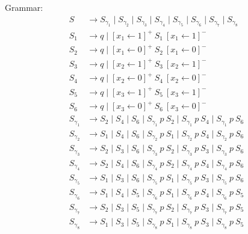 Grammar:
\begin{align*}
S & \to S_{\gamma_1} \mid S_{\gamma_2} \mid S_{\gamma_3} \mid S_{\gamma_4} \mid S_{\gamma_5} \mid S_{\gamma_6} \mid S_{\gamma_7} \mid S_{\gamma_8}\\
S_1 & \to q  
      \mid [x_1 \leftarrow 1]^+ \ S_1 \ [x_1 \leftarrow 1]^- \\ 
S_2 & \to q  
      \mid [x_1 \leftarrow 0]^+ \ S_2 \ [x_1 \leftarrow 0]^- \\ 
S_3 & \to q  
      \mid [x_2 \leftarrow 1]^+ \ S_3 \ [x_2 \leftarrow 1]^- \\ 
S_4 & \to q 
      \mid [x_2 \leftarrow 0]^+ \ S_4 \ [x_2 \leftarrow 0]^- \\ 
S_5 & \to q
      \mid [x_3 \leftarrow 1]^+ \ S_5 \ [x_3 \leftarrow 1]^- \\ 
S_6 & \to q
      \mid [x_3 \leftarrow 0]^+ \ S_6 \ [x_3 \leftarrow 0]^- \\ 
S_{\gamma_1} & \to S_2 \mid S_4 \mid S_6 \mid S_{\gamma_1} \ p \ S_2 \mid S_{\gamma_1} \ p \ S_4 \mid S_{\gamma_1} \ p \ S_6\\
S_{\gamma_2} & \to S_1 \mid S_4 \mid S_6 \mid S_{\gamma_2} \ p \ S_1 \mid S_{\gamma_2} \ p \ S_4 \mid S_{\gamma_2} \ p \ S_6\\
S_{\gamma_3} & \to S_2 \mid S_3 \mid S_6 \mid S_{\gamma_3} \ p \ S_2 \mid S_{\gamma_3} \ p \ S_3 \mid S_{\gamma_3} \ p \ S_6\\
S_{\gamma_4} & \to S_2 \mid S_4 \mid S_6 \mid S_{\gamma_4} \ p \ S_2 \mid S_{\gamma_4} \ p \ S_4 \mid S_{\gamma_4} \ p \ S_6\\
S_{\gamma_5} & \to S_1 \mid S_3 \mid S_6 \mid S_{\gamma_5} \ p \ S_1 \mid S_{\gamma_5} \ p \ S_3 \mid S_{\gamma_5} \ p \ S_6\\
S_{\gamma_6} & \to S_1 \mid S_4 \mid S_5 \mid S_{\gamma_6} \ p \ S_1 \mid S_{\gamma_6} \ p \ S_4 \mid S_{\gamma_6} \ p \ S_5\\
S_{\gamma_7} & \to S_2 \mid S_3 \mid S_5 \mid S_{\gamma_7} \ p \ S_2 \mid S_{\gamma_7} \ p \ S_3 \mid S_{\gamma_7} \ p \ S_5\\
S_{\gamma_8} & \to S_1 \mid S_3 \mid S_5 \mid S_{\gamma_8} \ p \ S_1 \mid S_{\gamma_8} \ p \ S_3 \mid S_{\gamma_8} \ p \ S_5\\
\end{align*}


